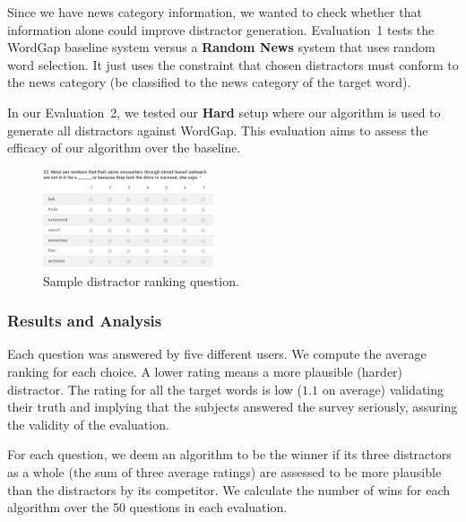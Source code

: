Since we have news category information, we wanted to check whether
that information alone could improve distractor generation.
Evaluation~1 tests the WordGap baseline system versus a {\bf Random News}
system that uses random word selection.  It just uses the constraint
that chosen distractors must conform to the news category (be
classified to the news category of the target word).

In our Evaluation~2, we tested our {\bf Hard} setup where our
algorithm is used to generate all distractors against WordGap.  This
evaluation aims to assess the efficacy of our algorithm over the
baseline.


\begin{figure}[th]
   \centering
   \includegraphics[width=0.45\textwidth]{distractor_new.png}
   \caption{Sample distractor ranking question.}
   \label{fig:distractor_1}
\end{figure}

\subsubsection{Results and Analysis}

Each question was answered by five different users.  We compute the
average ranking for each choice. A lower rating means a more plausible
(harder) distractor.  The rating for all the target words is low
($1.1$ on average) validating their truth and implying that the
subjects answered the survey seriously, assuring the validity of the
evaluation.

For each question, we deem an algorithm to be the winner if its three
distractors as a whole (the sum of three average ratings) are assessed
to be more plausible than the distractors by its competitor. We
calculate the number of wins for each algorithm over the 50 questions
in each evaluation. 

